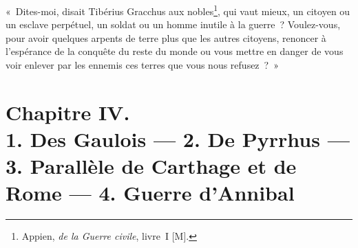 \documentclass[french,twoside]{book} %
\newcommand\chapteropen{} %
\newcommand\chapterclose{} %
\begin{document}
« Dites-moi, disait Tibérius Gracchus aux nobles\footnote{Appien, {\itshape de la Guerre civile}, livre I [M].}, qui vaut mieux, un citoyen ou un esclave perpétuel, un soldat ou un homme inutile à la guerre ? Voulez-vous, pour avoir quelques arpents de terre plus que les autres citoyens, renoncer à l’espérance de la conquête du reste du monde ou vous mettre en danger de vous voir enlever par les ennemis ces terres que vous nous refusez ? »
\chapterclose


\chapteropen
\chapter[{Chapitre IV. 1. Des Gaulois — 2. De Pyrrhus — 3. Parallèle de Carthage et de Rome — 4. Guerre d’Annibal}]{Chapitre IV. \\
1. Des Gaulois — 2. De Pyrrhus — 3. Parallèle de Carthage et de Rome — 4. Guerre d’Annibal}
\label{considérations\_Romains\_chap\_04}\renewcommand{\leftmark}{Chapitre IV. \\
1. Des Gaulois — 2. De Pyrrhus — 3. Parallèle de Carthage et de Rome — 4. Guerre d’Annibal}
\end{document}
